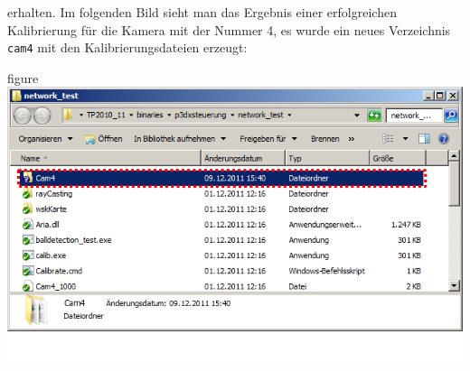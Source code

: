 \begin{itemize}
  erhalten. Im folgenden Bild sieht man das Ergebnis einer
  erfolgreichen Kalibrierung für die Kamera mit der Nummer 4, es wurde
  ein neues Verzeichnis \verb|cam4| mit den Kalibrierungsdateien erzeugt:
 \begin{nofloat}{figure}\centering
    \includegraphics[width=\linewidth]{bilder/calibrate4_red}
  \end{nofloat}
\end{itemize}